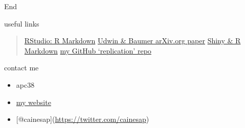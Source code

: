 \documentclass[ignorenonframetext,]{beamer}
\begin{document}
\begin{frame}{End}

\begin{block}{useful links}

\begin{quote}
\href{http://rmarkdown.rstudio.com/}{RStudio: R Markdown}
\href{http://arxiv.org/abs/1501.01613}{Udwin \& Baumer arXiv.org paper}
\href{http://shiny.rstudio.com/articles/interactive-docs.html}{Shiny \&
R Markdown} \href{https://github.com/cainesap/replication}{my GitHub
`replication' repo}
\end{quote}

\end{block}

\begin{block}{contact me}

\begin{itemize}
\itemsep1pt\parskip0pt
\item
  apc38
\item
  \href{http://apc38.user.srcf.net/}{my website}
\item
  {[}@cainesap{]}(\url{https://twitter.com/cainesap})
\end{itemize}

\end{block}

\end{frame}
\end{document}
